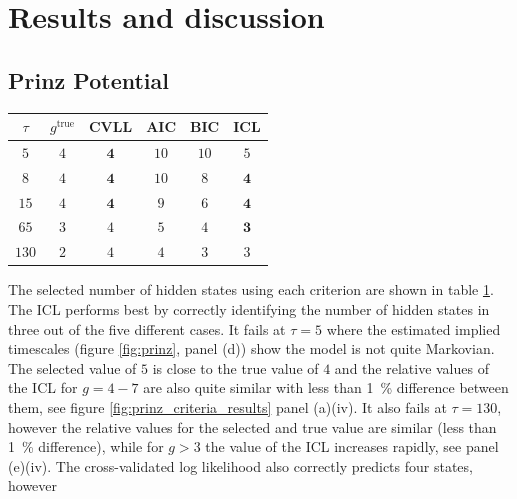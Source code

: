 \section{Results and discussion}\label{sec:hmm_results}
\subsection{Prinz Potential}

\begin{table}
    \centering
    \begin{tabular}{|c|c|c|c|c|c|}
    \hline
    $\tau$ & $g^{\mathrm{true}}$ & CVLL & AIC & BIC & ICL  \\
    \hline\hline
     $5$  & $4$ & $\mathbf{4}$  & $10$ & $10$ & $5$ \\
     $8$  & $4$ & $\mathbf{4}$ & $10$ & $8$  & $\mathbf{4}$  \\
     $15$ & $4$ & $\mathbf{4}$  & $9$  & $6$  & $\mathbf{4}$  \\
     $65 $& $3$ & $4$  & $5$  & $4$  & $\mathbf{3}$  \\
     $130$& $2$ & $4$  & $4$  & $3$  & $3$  \\
     \hline
    \end{tabular}
    \label{tab:prinz_criteria_results}
\end{table}

The selected number of hidden states using each criterion are shown in table \ref{tab:prinz_criteria_results}.  The ICL performs best by correctly identifying the number of hidden states in three out of the five different cases. 
It fails at $\tau=5$ where the estimated implied timescales (figure \ref{fig:prinz}, panel (d)) show the model is not quite Markovian. The selected value of $5$ is close to the true value of $4$  and the relative values of the ICL for $g=4 - 7$ are also quite similar with less than \SI{1}{\percent} difference between them, see figure \ref{fig:prinz_criteria_results} panel (a)(iv). It also fails at $\tau=130$, however the relative values for the selected and true value are similar (less than \SI{1}{\percent} difference), while for $g>3$ the value of the ICL increases rapidly, see panel (e)(iv). The cross-validated log likelihood also correctly predicts four states, however 

